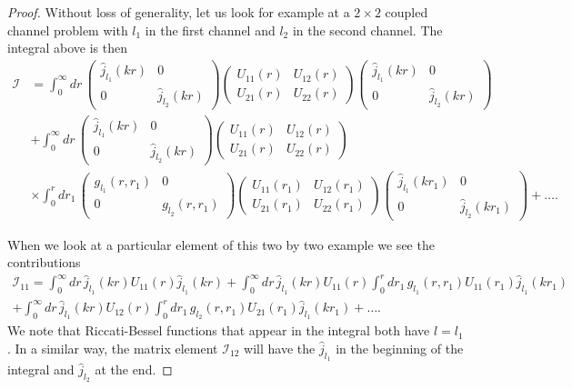 \documentclass[mathpazo]{cicp}
\begin{document}
\begin{proof}
Without loss of generality, let us look for example at a $2\times2$ coupled channel problem with $l_1$ in the first channel and $l_2$ in the second channel. The integral above is then
\begin{align}
	\mathcal{I} &= \int_{0}^{\infty} dr \,
	\begin{pmatrix}
		\hat{j}_{l_1}(kr) & 0 \\
		0 & \hat{j}_{l_2}(kr)
	\end{pmatrix}
	\begin{pmatrix}
		U_{11}(r) &U_{12}(r) \\
		U_{21}(r) &U_{22}(r)
	\end{pmatrix}
	\begin{pmatrix}
		\hat{j}_{l_1}(kr) & 0 \\
		0 & \hat{j}_{l_2}(kr)
	\end{pmatrix} \\
	&+\int_{0}^{\infty} dr \,
	\begin{pmatrix}
		\hat{j}_{l_1}(kr) & 0 \\
		0 & \hat{j}_{l_2}(kr)
	\end{pmatrix}
	\begin{pmatrix}
		U_{11}(r) & U_{12}(r) \\
		U_{21}(r) & U_{22}(r)
	\end{pmatrix} \\
	&\times \int_0^r dr_1 \,
	\begin{pmatrix}
		g_{l_1}(r,r_1) & 0 \\
		0 & g_{l_2}(r,r_1)
	\end{pmatrix}
	\begin{pmatrix}
		U_{11}(r_1) &U_{12}(r_1) \\
		U_{21}(r_1) &U_{22}(r_1)
	\end{pmatrix}
	\begin{pmatrix}
		\hat{j}_{l_1}(kr_1) & 0 \\
		0 & \hat{j}_{l_2}(kr_1)
	\end{pmatrix} + \ldots .
\end{align}

When we look at a particular element of this two by two example we see the contributions
\begin{multline}
	\mathcal{I}_{11} = \int_0^\infty dr \, \hat{j}_{l_1}(kr) U_{11}(r) \hat{j}_{l_1}(kr)
	+ \int_0^\infty dr \, \hat{j}_{l_1}(kr) U_{11}(r) \int_0^r dr_1 \, g_{l_1}(r,r_1) U_{11}(r_1) \hat{j}_{l_1}(kr_1) \\
	+ \int_0^\infty dr \, \hat{j}_{l_1}(kr) U_{12}(r) \int_0^r dr_1 \, g_{l_2}(r,r_1) U_{21}(r_1) \hat{j}_{l_1}(kr_1) + \ldots .
\end{multline}
We note that Riccati-Bessel functions that appear in the integral both have $l=l_1$. In a similar way, 
the matrix element $\mathcal{I}_{12}$ will have the $\hat{j}_{l_1}$ in the beginning of the integral and $\hat j_{l_2}$ at the end.


\end{proof}
\end{document}
